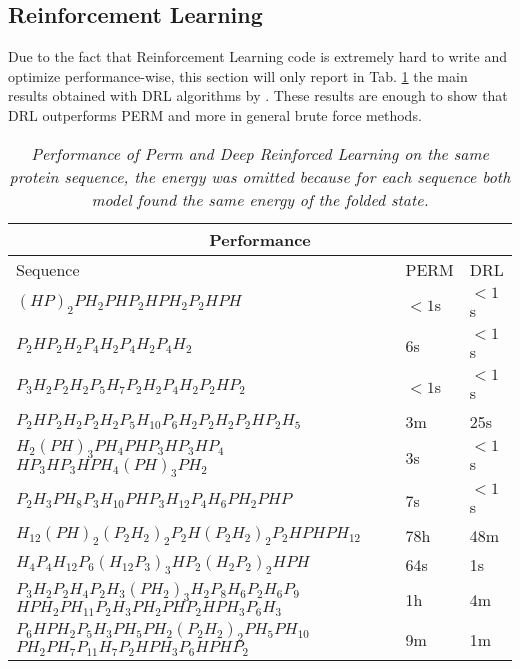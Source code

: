 \subsection{Reinforcement Learning}
Due to the fact that Reinforcement Learning code is extremely hard to write and optimize performance-wise, this section will only report in Tab. \ref{tab:RL} the main results obtained with DRL algorithms by \cite{jafari2020solving}.
These results are enough to show that DRL outperforms PERM and more in general brute force methods.

\FloatBarrier
\begin{table}[H]
\centering
\begin{tabular}[c]{ |p{8cm}||p{2cm}||p{2cm}|}
 \hline
 \multicolumn{3}{|c|}{Performance} \\
 \hline
 Sequence  & PERM & DRL\\
 \hline
$(HP)_2PH_2PHP_2HPH_2P_2HPH$ & $< 1$s & $< 1$s\\
 \hline
$P_2HP_2H_2P_4H_2P_4H_2P_4H_2$ & 6s  & $< 1$s\\
 \hline
$P_3H_2P_2H_2P_5H_7P_2H_2P_4H_2P_2HP_2$ & $< 1$s & $< 1$s\\
\hline
$P_2HP_2H_2P_2H_2P_5H_{10}P_6H_2P_2H_2P_2HP_2H_5$ & 3m & 25s\\
\hline
$H_2(PH)_3PH_4PHP_3HP_3HP_4$
$HP_3HP_3HPH_4(PH)_3PH_2$ & 3s & $< 1$s\\
\hline
$P_2H_3PH_8P_3H_{10}PHP_3H_{12}P_4H_6PH_2PHP$ & 7s & $< 1$s\\
\hline 
$H_{12}(PH)_2(P_2H_2)_2P_2H(P_2H_2)_2P_2HPHPH_{12}$ & 78h & 48m\\
\hline
$H_4P_4H_{12}P_6(H_{12}P_3)_3HP_2(H_2P_2)_2HPH$ & 64s & 1s\\
\hline
$P_3H_2P_2H_4P_2H_3(PH_2)_3H_2P_8H_6P_2H_6P_9$
$HPH_2PH_{11}P_2H_3PH_2PHP_2HPH_3P_6H_3$ & 1h & 4m\\
\hline
$P_6HPH_2P_5H_3PH_5PH_2(P_2H_2)_2PH_5PH_{10}$
$PH_2PH_7P_{11}H_7P_2HPH_3P_6HPHP_2$ & 9m & 1m\\
\hline

\end{tabular}\\
\caption{\emph{Performance of Perm and Deep Reinforced Learning on the same protein sequence, the energy was omitted because for each sequence both model found the same energy of the folded state.}}
\label{tab:RL}
\end{table}

\FloatBarrier

